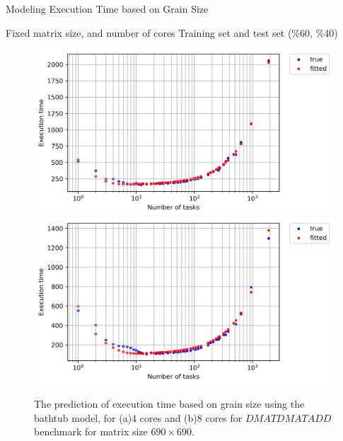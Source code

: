 \documentclass[10pt]{beamer}
\begin{document}
\begin{frame}{Modeling Execution Time based on Grain Size}
\begin{outline}	
	\1Fixed matrix size, and number of cores	
	\1Training set and test set (\%60, \%40)
	\begin{figure}[H]
		\centering
		{\includegraphics[scale=.4]{images/bathtub/pred/pred_690_4.png}\label{fig22:a}}
		{\includegraphics[scale=.4]{images/bathtub/pred/pred_690_8.png}\label{fig22:b}}	
		\caption{The prediction of execution time based on grain size using the bathtub model, for (a)4 cores and (b)8 cores for $DMATDMATADD$ benchmark for matrix size $690\times690$.}	
		\label{fig22}
	\end{figure}
\end{outline}
\end{frame}
\end{document}
